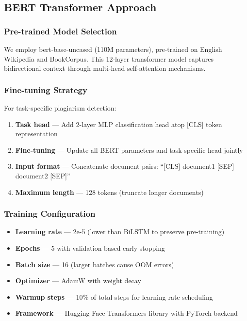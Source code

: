 \subsection{BERT Transformer Approach}

\subsubsection{Pre-trained Model Selection}

We employ bert-base-uncased (110M parameters), pre-trained on English Wikipedia and BookCorpus. This 12-layer transformer model captures bidirectional context through multi-head self-attention mechanisms.

\subsubsection{Fine-tuning Strategy}

For task-specific plagiarism detection:

\begin{enumerate}
  \item \textbf{Task head} --- Add 2-layer MLP classification head atop [CLS] token representation
  \item \textbf{Fine-tuning} --- Update all BERT parameters and task-specific head jointly
  \item \textbf{Input format} --- Concatenate document pairs: ``[CLS] document1 [SEP] document2 [SEP]''
  \item \textbf{Maximum length} --- 128 tokens (truncate longer documents)
\end{enumerate}

\subsubsection{Training Configuration}

\begin{itemize}
  \item \textbf{Learning rate} --- 2e-5 (lower than BiLSTM to preserve pre-training)
  \item \textbf{Epochs} --- 5 with validation-based early stopping
  \item \textbf{Batch size} --- 16 (larger batches cause OOM errors)
  \item \textbf{Optimizer} --- AdamW with weight decay
  \item \textbf{Warmup steps} --- 10\% of total steps for learning rate scheduling
  \item \textbf{Framework} --- Hugging Face Transformers library with PyTorch backend
\end{itemize}

